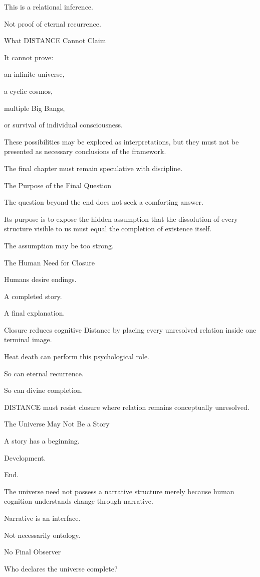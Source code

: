This is a relational inference.

Not proof of eternal recurrence.

What DISTANCE Cannot Claim

It cannot prove:

an infinite universe,

a cyclic cosmos,

multiple Big Bangs,

or survival of individual consciousness.

These possibilities may be explored as interpretations, but they must not be presented as necessary conclusions of the framework.

The final chapter must remain speculative with discipline.

The Purpose of the Final Question

The question beyond the end does not seek a comforting answer.

Its purpose is to expose the hidden assumption that the dissolution of every structure visible to us must equal the completion of existence itself.

The assumption may be too strong.

The Human Need for Closure

Humans desire endings.

A completed story.

A final explanation.

Closure reduces cognitive Distance by placing every unresolved relation inside one terminal image.

Heat death can perform this psychological role.

So can eternal recurrence.

So can divine completion.

DISTANCE must resist closure where relation remains conceptually unresolved.

The Universe May Not Be a Story

A story has a beginning.

Development.

End.

The universe need not possess a narrative structure merely because human cognition understands change through narrative.

Narrative is an interface.

Not necessarily ontology.

No Final Observer

Who declares the universe complete?

